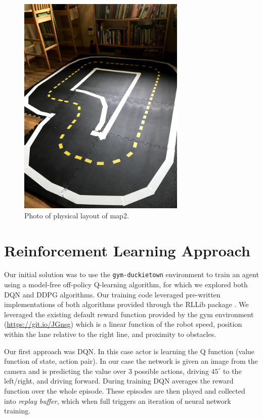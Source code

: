 \documentclass{article}
\begin{document}
\begin{figure}[H]
\includegraphics[width=8cm,keepaspectratio]{map2_real}
\centering
\caption{Photo of physical layout of map2.}
\label{fig:map2_real}
\end{figure}

\section{Reinforcement Learning Approach}

Our initial solution was to use the \texttt{gym-duckietown} environment to train an agent using a model-free off-policy Q-learning algorithm, for which we explored both DQN \cite{DBLP:journals/corr/MnihKSGAWR13} and DDPG \cite{journals/corr/LillicrapHPHETS15} algorithms. Our training code leveraged pre-written implementations of both algorithms provided through the RLLib package \cite{DBLP:journals/corr/abs-1712-09381}. We leveraged the existing default reward function provided by the gym environment (\url{https://git.io/JGnsg}) which is a linear function of the robot speed, position within the lane relative to the right line, and proximity to obstacles.

Our first approach was DQN. In this case actor is learning the Q function (value function of state, action pair). In our case the network is given an image from the camera and is predicting the value over 3 possible actions, driving $45^\circ$ to the left/right, and driving forward. During training DQN averages the reward function over the whole episode. These episodes are then played and collected into \textit{replay buffer}, which when full triggers an iteration of neural network training.
\end{document}
